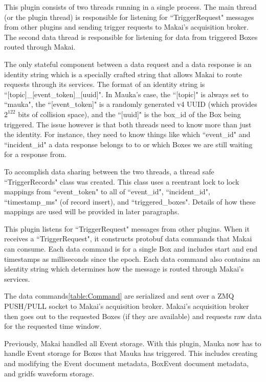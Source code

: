 This plugin consists of two threads running in a single process. The main thread (or the plugin thread) is responsible for listening for ``TriggerRequest" messages from other plugins and sending trigger requests to Makai's acquisition broker. The second data thread is responsible for listening for data from triggered Boxes routed through Makai.

The only stateful component between a data request and a data response is an identity string which is a specially crafted string that allows Makai to route requests through its services. The format of an identity string is ``[topic]\_[event\_token]\_[uuid]". In Mauka's case, the ``[topic]" is always set to ``mauka", the ``[event\_token]" is a randomly generated v4 UUID (which provides $2^{122}$ bits of collision space), and the ``[uuid]" is the box\_id of the Box being triggered. The issue however is that both threads need to know more than just the identity. For instance, they need to know things like which ``event\_id" and ``incident\_id" a data response belongs to to or which Boxes we are still waiting for a response from.

To accomplish data sharing between the two threads, a thread safe ``TriggerRecords" class was created. This class uses a reentrant lock to lock mappings from ``event\_token" to all of ``event\_id", ``incident\_id", ``timestamp\_ms" (of record insert), and ``triggered\_boxes".  Details of how these mappings are used will be provided in later paragraphs.

This plugin listens for ``TriggerRequest" messages from other plugins. When it receives a ``TriggerRequest", it constructs protobuf data commands that Makai can consume. Each data command is for a single Box and includes start and end timestamps as milliseconds since the epoch. Each data command also contains an identity string which determines how the message is routed through Makai's services.

The data commands\ref{table:Command} are serialized and sent over a ZMQ PUSH/PULL socket to Makai's acquisition broker. Makai's acquisition broker then goes out to the requested Boxes (if they are available) and requests raw data for the requested time window.

Previously, Makai handled all Event storage. With this plugin, Mauka now has to handle Event storage for Boxes that Mauka has triggered. This includes creating and modifying the Event document metadata, BoxEvent document metadata, and gridfs waveform storage.

